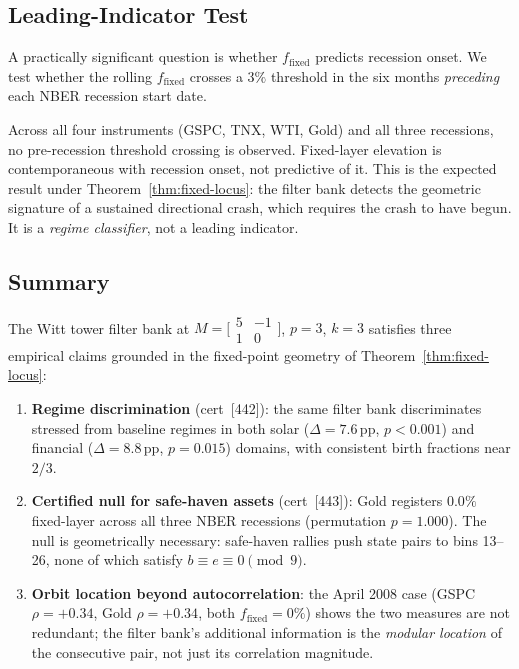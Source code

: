 \subsection{Leading-Indicator Test}
\label{sec:leading-indicator}

A practically significant question is whether $f_\mathrm{fixed}$ predicts
recession onset.  We test whether the rolling $f_\mathrm{fixed}$ crosses
a $3\%$ threshold in the six months \emph{preceding} each NBER recession
start date.

Across all four instruments (GSPC, TNX, WTI, Gold) and all three recessions,
no pre-recession threshold crossing is observed.  Fixed-layer elevation is
contemporaneous with recession onset, not predictive of it.  This is the
expected result under Theorem~\ref{thm:fixed-locus}: the filter bank
detects the geometric signature of a sustained directional crash, which
requires the crash to have begun.  It is a \emph{regime classifier}, not
a leading indicator.

\subsection{Summary}
\label{sec:witt-financial-summary}

The Witt tower filter bank at $M = \bigl[\begin{smallmatrix}5&-1\\1&0
\end{smallmatrix}\bigr]$, $p=3$, $k=3$ satisfies three empirical claims
grounded in the fixed-point geometry of Theorem~\ref{thm:fixed-locus}:

\begin{enumerate}
\item \textbf{Regime discrimination} (cert~[442]): the same filter bank
  discriminates stressed from baseline regimes in both solar
  ($\Delta = 7.6$\,pp, $p < 0.001$) and financial ($\Delta = 8.8$\,pp,
  $p = 0.015$) domains, with consistent birth fractions near $2/3$.

\item \textbf{Certified null for safe-haven assets} (cert~[443]): Gold
  registers $0.0\%$ fixed-layer across all three NBER recessions (permutation
  $p = 1.000$).  The null is geometrically necessary: safe-haven rallies push
  state pairs to bins 13--26, none of which satisfy $b \equiv e \equiv 0
  \pmod{9}$.

\item \textbf{Orbit location beyond autocorrelation}: the April 2008
  case (GSPC $\rho = +0.34$, Gold $\rho = +0.34$, both $f_\mathrm{fixed}
  = 0\%$) shows the two measures are not redundant; the filter bank's
  additional information is the \emph{modular location} of the consecutive
  pair, not just its correlation magnitude.
\end{enumerate}

